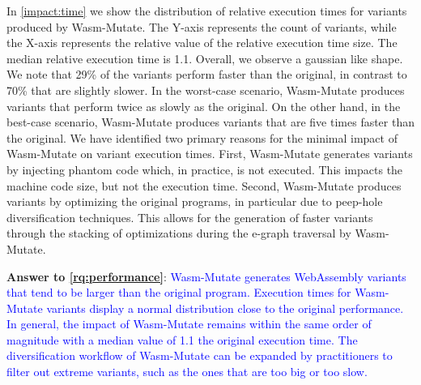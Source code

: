 \documentclass[a4paper,fleqn]{cas-dc}
\newcommand{\tool}{{\sc Wasm-Mutate}\xspace}
\newcommand{\Wasm}{WebAssembly\xspace}
\newenvironment{revision1}{\color{blue}}{}
\newcommand{\revision}[1]{\textcolor{blue}{#1}}
\begin{document}
\begin{revision1}
In \autoref{impact:time} we show the distribution of relative execution times for variants produced by \tool.
The Y-axis represents the count of variants, while the X-axis represents the relative value of the relative execution time size.
The median relative execution time is 1.1.
Overall, we observe a gaussian like shape.
We note that 29\% of the variants perform faster than the original, in contrast to 70\% that are slightly slower.
In the worst-case scenario, \tool produces variants that perform twice as slowly as the original.
On the other hand, in the best-case scenario, \tool produces variants that are five times faster than the original.
We have identified two primary reasons for the minimal impact of \tool on variant execution times.
First, \tool generates variants by injecting phantom code which, in practice, is not executed.
This impacts the machine code size, but not the execution time.
Second, \tool produces variants by optimizing the original programs, in particular due to peep-hole diversification techniques.
This allows for the generation of faster variants through the stacking of optimizations during the e-graph traversal by \tool.




\begin{tcolorbox}[boxrule=1pt,arc=.3em,boxsep=-1.3mm]
  \textbf{Answer to \ref{rq:performance}}: 
    \revision{
    \tool generates \Wasm variants that tend to be larger than the original program. 
    Execution times for \tool variants display a normal distribution close to the original performance.
    In general, the impact of \tool remains within the same order of magnitude with a median value of 1.1 the original execution time. 
    The diversification workflow of \tool can be expanded by practitioners to filter out extreme variants, such as the ones that are too big or too slow. 
    }
\end{tcolorbox}

\end{revision1}

\subsection{\rqdefensive}
\end{document}
